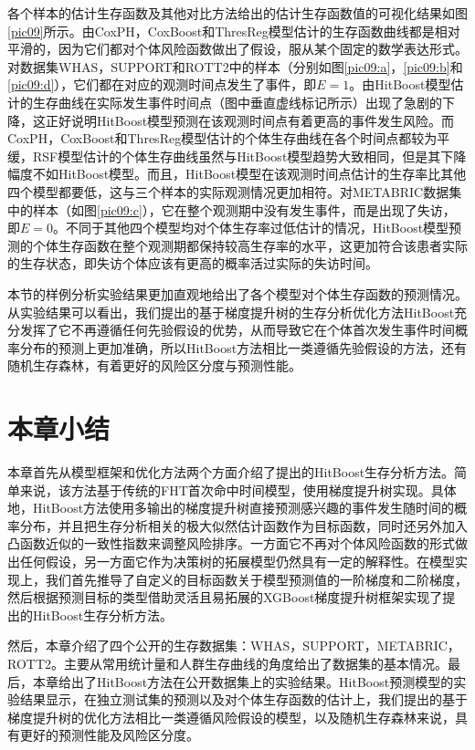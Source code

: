 各个样本的估计生存函数及其他对比方法给出的估计生存函数值的可视化结果如图\ref{pic09}所示。由CoxPH，CoxBoost和ThresReg模型估计的生存函数曲线都是相对平滑的，因为它们都对个体风险函数做出了假设，服从某个固定的数学表达形式。对数据集WHAS，SUPPORT和ROTT2中的样本（分别如图\ref{pic09:a}，\ref{pic09:b}和\ref{pic09:d}），它们都在对应的观测时间点发生了事件，即$E=1$。由HitBoost模型估计的生存曲线在实际发生事件时间点（图中垂直虚线标记所示）出现了急剧的下降，这正好说明HitBoost模型预测在该观测时间点有着更高的事件发生风险。而CoxPH，CoxBoost和ThresReg模型估计的个体生存曲线在各个时间点都较为平缓，RSF模型估计的个体生存曲线虽然与HitBoost模型趋势大致相同，但是其下降幅度不如HitBoost模型。而且，HitBoost模型在该观测时间点估计的生存率比其他四个模型都要低，这与三个样本的实际观测情况更加相符。对METABRIC数据集中的样本（如图\ref{pic09:c}），它在整个观测期中没有发生事件，而是出现了失访，即$E=0$。不同于其他四个模型均对个体生存率过低估计的情况，HitBoost模型预测的个体生存函数在整个观测期都保持较高生存率的水平，这更加符合该患者实际的生存状态，即失访个体应该有更高的概率活过实际的失访时间。 

本节的样例分析实验结果更加直观地给出了各个模型对个体生存函数的预测情况。从实验结果可以看出，我们提出的基于梯度提升树的生存分析优化方法HitBoost充分发挥了它不再遵循任何先验假设的优势，从而导致它在个体首次发生事件时间概率分布的预测上更加准确，所以HitBoost方法相比一类遵循先验假设的方法，还有随机生存森林，有着更好的风险区分度与预测性能。

\section{本章小结}

本章首先从模型框架和优化方法两个方面介绍了提出的HitBoost生存分析方法。简单来说，该方法基于传统的FHT首次命中时间模型，使用梯度提升树实现。具体地，HitBoost方法使用多输出的梯度提升树直接预测感兴趣的事件发生随时间的概率分布，并且把生存分析相关的极大似然估计函数作为目标函数，同时还另外加入凸函数近似的一致性指数来调整风险排序。一方面它不再对个体风险函数的形式做出任何假设，另一方面它作为决策树的拓展模型仍然具有一定的解释性。在模型实现上，我们首先推导了自定义的目标函数关于模型预测值的一阶梯度和二阶梯度，然后根据预测目标的类型借助灵活且易拓展的XGBoost梯度提升树框架实现了提出的HitBoost生存分析方法。

然后，本章介绍了四个公开的生存数据集：WHAS，SUPPORT，METABRIC，ROTT2。主要从常用统计量和人群生存曲线的角度给出了数据集的基本情况。最后，本章给出了HitBoost方法在公开数据集上的实验结果。HitBoost预测模型的实验结果显示，在独立测试集的预测以及对个体生存函数的估计上，我们提出的基于梯度提升树的优化方法相比一类遵循风险假设的模型，以及随机生存森林来说，具有更好的预测性能及风险区分度。
